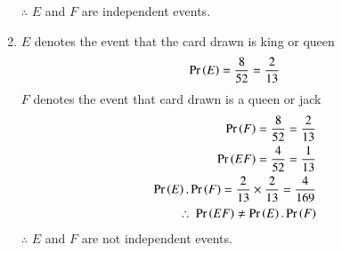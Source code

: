\documentclass[12pt, journal]{IEEEtran}
\begin{document}
\begin{enumerate}[label=(\roman*)]
			$\therefore$  $E$ and $F$ are independent events. \\
		\item
			$E$ denotes the event that the card drawn is king or queen
			\begin{align}
				\Pr\left(E\right) = \frac{8}{52} = \frac{2}{13}
			\end{align}
			$F$ denotes the event that card drawn is a queen or jack 
			\begin{align}
				\Pr\left(F\right) = \frac{8}{52} = \frac{2}{13}\\
				\Pr\left(EF\right) = \frac{4}{52} = \frac{1}{13}\\
				\Pr\left(E\right).\Pr\left(F\right) = \frac{2}{13} \times \frac{2}{13} = \frac{4}{169}\\
				\therefore~\Pr\left(EF\right) \neq \Pr\left(E\right).\Pr\left(F\right)
			\end{align}	
			$\therefore$  $E$ and $F$ are not independent events. \\
		
	\end{enumerate}
\end{document}
